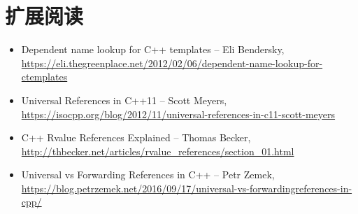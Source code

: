 \section{扩展阅读}
\begin{itemize}
\item
Dependent name lookup for C++ templates – Eli Bendersky, \url{https://eli.thegreenplace.net/2012/02/06/dependent-name-lookup-for-ctemplates}

\item
Universal References in C++11 – Scott Meyers, \url{https://isocpp.org/blog/2012/11/universal-references-in-c11-scott-meyers}

\item
C++ Rvalue References Explained – Thomas Becker, \url{http://thbecker.net/articles/rvalue_references/section_01.html}

\item
Universal vs Forwarding References in C++ – Petr Zemek, \url{https://blog.petrzemek.net/2016/09/17/universal-vs-forwardingreferences-in-cpp/}
\end{itemize}